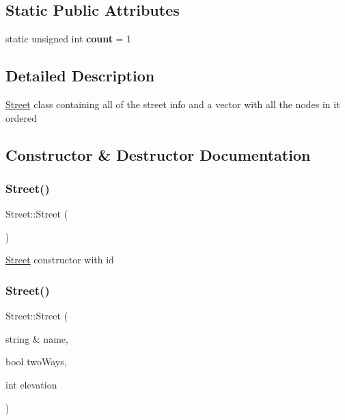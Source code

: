 \subsection*{Static Public Attributes}
\begin{DoxyCompactItemize}
\item 
\mbox{\label{class_street_aea6a60e70d589d29492fec22554cc513}} 
static unsigned int {\bfseries count} = 1
\end{DoxyCompactItemize}


\subsection{Detailed Description}
\mbox{\hyperlink{class_street}{Street}} class containing all of the street info and a vector with all the nodes in it ordered 

\subsection{Constructor \& Destructor Documentation}
\mbox{\label{class_street_a67c6b12ed40488038123d2798586a49a}} 
\subsubsection{\texorpdfstring{Street()}{Street()}\hspace{0.1cm}{\footnotesize\ttfamily [1/2]}}
{\footnotesize\ttfamily Street\+::\+Street (\begin{DoxyParamCaption}{ }\end{DoxyParamCaption})\hspace{0.3cm}{\ttfamily [explicit]}}

\mbox{\hyperlink{class_street}{Street}} constructor with id \mbox{\label{class_street_a5a9d10bd309a37eebd309aefb678f2fc}} 
\subsubsection{\texorpdfstring{Street()}{Street()}\hspace{0.1cm}{\footnotesize\ttfamily [2/2]}}
{\footnotesize\ttfamily Street\+::\+Street (\begin{DoxyParamCaption}\item[{string \&}]{name,  }\item[{bool}]{two\+Ways,  }\item[{int}]{elevation }\end{DoxyParamCaption})}

